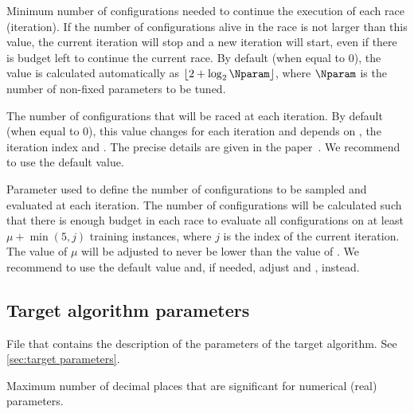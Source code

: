 \begin{description}
Minimum number of configurations needed to continue the execution of each race (iteration). If the number of configurations alive in the race is not larger than this value, the current iteration will stop and a new iteration will start, even if there is budget left to continue the current race. By default (when equal to 0), the value is calculated automatically as $\lfloor 2 + \log_{2}\Nparam \rfloor$, where $\Nparam$ is the number of non-fixed parameters to be tuned.

  The number of configurations that will be raced at each iteration. By default (when equal to 0), this value changes for each iteration and depends on , the iteration index and . The precise details are given in the \irace paper~\citep{LopDubPerStuBir2016irace}.
We recommend to use the default value.

  Parameter used to define the number of configurations to be sampled and evaluated at each iteration. The number of configurations will be calculated such that there is enough budget in each race to evaluate all configurations on at least $\mu + \min(5,j)$ training instances, where $j$ is the index of the current iteration. The value of $\mu$ will be adjusted to never be lower than the value of . We recommend to use the default value and, if needed, adjust and , instead.

\end{description}

\subsection[Target algorithm parameters]{Target algorithm parameters}
\begin{description}
File that contains the description of the parameters of the target algorithm. See \autoref{sec:target parameters}.

Maximum number of decimal places that are significant for numerical (real) parameters.

\end{description}

